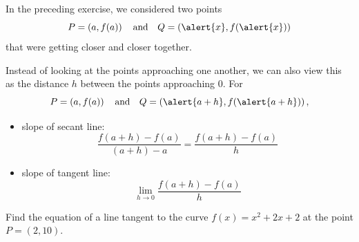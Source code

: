 \documentclass[cal1spr16Lectures.tex]{subfiles}
\begin{document}
\begin{frame}{}
In the preceding exercise, we considered two points 
\vspace{-0.6pc}
\[P=\left(a,f(a)\right)\quad\text{and}\quad Q=\left(\alert{x},f(\alert{x})\right)\]
that were getting closer and closer together.

\vspace{2pc}
Instead of looking at the points approaching one another, we can also view this as the distance $h$ between the points approaching 0.  For 
\vspace{-0.5pc}
\[P=\left(a,f(a)\right)\quad\text{and}\quad Q=\left(\alert{a+h},f(\alert{a+h})\right),\]
\end{frame}

\begin{frame}
\begin{itemize}
\item slope of secant line:  
\[\frac{f(a+h)-f(a)}{(a+h)-a}= \dfrac{f(a+h)-f(a)}{h}\]
\item slope of tangent line:  
\[\lim_{h \to 0} \frac{f(a+h)-f(a)}{h}\]
\end{itemize}
\end{frame}

\begin{frame}
\end{frame}

\begin{frame}
\begin{exe} Find the equation of a line tangent to the curve $f(x)=x^2+2x+2$ at the point $P=(2,10)$. \end{exe}
\end{frame}
\end{document}
